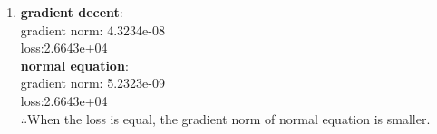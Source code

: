 \documentclass[english,onecolumn]{IEEEtran}
\begin{document}
\begin{enumerate}
\begin{enumerate}
        For normal equation:\\
        Cost of computing $\mathbf{C}=\mathbf{A}^{T} \mathbf{A}= n \times n \times (m+m-1) = n^2 (2m-1)$\\
        Cost of computing $\mathbf{d}=\mathbf{A}^{T} \mathbf{y}=n \times (m+m-1) = n (2m-1)$\\
        Cost of computing $\mathbf{C}=\mathbf{G}^{T} \mathbf{G}=\sum_{i=1}^n (2i-1)(n+1-i) = \sum_{i=1}^n [(n+1)(2i-1)-2i^2+i]= (n+1)(2\times \frac{n(n+1)}{2} - n) - 2 \times \frac{n(n+1)(2n+1)}{6} + \frac{n(n+1)}{2}=n(n+1)(\frac{2n+1}{6}) $\\
        Cost of computing $\mathbf{G^{T} z}=\mathbf{d}$ and $\mathbf{G} \mathbf{x}_{\mathrm{LS}}=\mathbf{z} = 2 \times \sum_{i=1}^n (2i-1) = 2n^2$\\        
        $\therefore$ Total flops = $n^2(2m-1)+ n(2m-1)+n(n+1)(\frac{2n+1}{6})+2n^2$\\
        
        \item
        \textbf{gradient decent}:\\
        gradient norm: 4.3234e-08 \\
        loss:2.6643e+04\\
        \textbf{normal equation}:\\
        gradient norm: 5.2323e-09 \\
        loss:2.6643e+04\\
        $\therefore $When the loss is equal, the gradient norm of normal equation is smaller.


    \end{enumerate}
    
\end{enumerate}

\newpage
\end{document}
